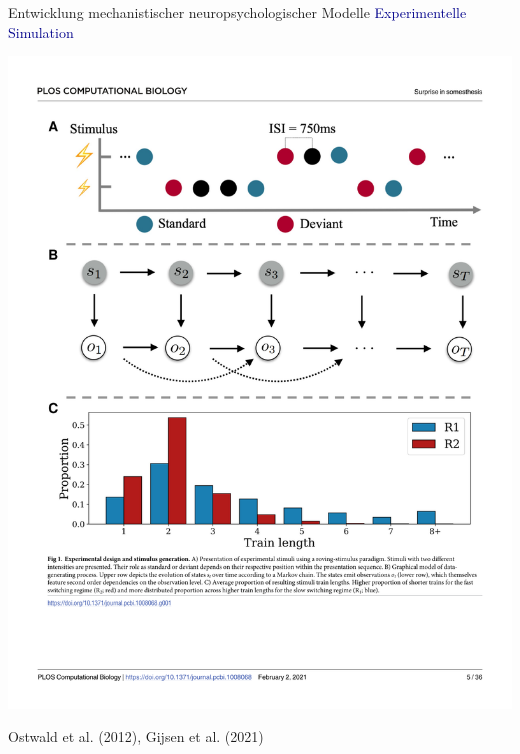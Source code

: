\documentclass[
  8pt,
  ignorenonframetext,
]{beamer}
\begin{document}
\begin{frame}{Entwicklung mechanistischer neuropsychologischer Modelle}
\protect\hypertarget{entwicklung-mechanistischer-neuropsychologischer-modelle-3}{}
\textcolor{darkblue}{Experimentelle Simulation} \vfill

\begin{center}\includegraphics[width=0.7\linewidth]{2_Abbildungen/pfm_2_gijsen_experimentelle_simulation} \end{center}
\vfill
\flushright
\footnotesize

Ostwald et al. (2012), Gijsen et al. (2021)
\end{frame}
\end{document}
